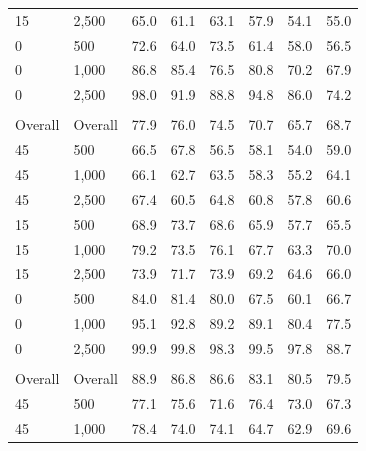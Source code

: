 \documentclass[twoside,11pt]{article}\usepackage[]{graphicx}\usepackage[]{xcolor}
\newenvironment{knitrout}{}{} %
\begin{document}
\begin{knitrout}
\begin{landscape}
\begin{longtable}[t]{llcccccc}
\hspace{1em}15 & 2,500 & 65.0 & 61.1 & 63.1 & 57.9 & 54.1 & 55.0\\
\hspace{1em}0 & 500 & 72.6 & 64.0 & 73.5 & 61.4 & 58.0 & 56.5\\
\hspace{1em}0 & 1,000 & 86.8 & 85.4 & 76.5 & 80.8 & 70.2 & 67.9\\
\hspace{1em}0 & 2,500 & 98.0 & 91.9 & 88.8 & 94.8 & 86.0 & 74.2\\
\addlinespace[0.3em]
\multicolumn{8}{l}{\textit{\textbf{Combination effects}}}\\
\hline
\hspace{1em}Overall & Overall & 77.9 & 76.0 & 74.5 & 70.7 & 65.7 & 68.7\\
\hspace{1em}45 & 500 & 66.5 & 67.8 & 56.5 & 58.1 & 54.0 & 59.0\\
\hspace{1em}45 & 1,000 & 66.1 & 62.7 & 63.5 & 58.3 & 55.2 & 64.1\\
\hspace{1em}45 & 2,500 & 67.4 & 60.5 & 64.8 & 60.8 & 57.8 & 60.6\\
\hspace{1em}15 & 500 & 68.9 & 73.7 & 68.6 & 65.9 & 57.7 & 65.5\\
\hspace{1em}15 & 1,000 & 79.2 & 73.5 & 76.1 & 67.7 & 63.3 & 70.0\\
\hspace{1em}15 & 2,500 & 73.9 & 71.7 & 73.9 & 69.2 & 64.6 & 66.0\\
\hspace{1em}0 & 500 & 84.0 & 81.4 & 80.0 & 67.5 & 60.1 & 66.7\\
\hspace{1em}0 & 1,000 & 95.1 & 92.8 & 89.2 & 89.1 & 80.4 & 77.5\\
\hspace{1em}0 & 2,500 & 99.9 & 99.8 & 98.3 & 99.5 & 97.8 & 88.7\\
\addlinespace[0.3em]
\multicolumn{8}{l}{\textit{\textbf{Main effects}}}\\
\hline
\hspace{1em}Overall & Overall & 88.9 & 86.8 & 86.6 & 83.1 & 80.5 & 79.5\\
\hspace{1em}45 & 500 & 77.1 & 75.6 & 71.6 & 76.4 & 73.0 & 67.3\\
\hspace{1em}45 & 1,000 & 78.4 & 74.0 & 74.1 & 64.7 & 62.9 & 69.6\\

\end{longtable}
\end{landscape}
\end{knitrout}
\end{document}
